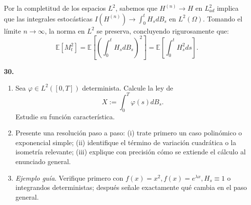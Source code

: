 \documentclass[11pt, letterpaper]{article}
\begin{document}
\begin{solucion}
    Por la completitud de los espacios $L^2$, sabemos que $H^{(n)} \to H$ en $L^2_{ad}$ implica que las integrales estocásticas $I(H^{(n)}) \to \int_0^t H_s dB_s$ en $L^2(\Omega)$. 
    Tomando el límite $n \to \infty$, la norma en $L^2$ se preserva, concluyendo rigurosamente que:
    \[ \mathbb{E}[M_t^2] = \mathbb{E}\left[ \left( \int_0^t H_s dB_s \right)^2 \right] = \mathbb{E}\left[ \int_0^t H_s^2 ds \right]. \]
\end{solucion}

\newpage

\begin{ejercicio}
    \textbf{30.} 
    \begin{enumerate}
        \item Sea $\varphi \in L^2([0,T])$ determinista. Calcule la ley de
        \[ X := \int_0^T \varphi(s) dB_s. \]
        Estudie su función característica.
        \item Presente una resolución paso a paso: (i) trate primero un caso polinómico o exponencial simple; (ii) identifique el término de variación cuadrática o la isometría relevante; (iii) explique con precisión cómo se extiende el cálculo al enunciado general.
        \item \textit{Ejemplo guía}. Verifique primero con $f(x) = x^2, f(x) = e^{\lambda x}, H_s \equiv 1$ o integrandos deterministas; después señale exactamente qué cambia en el paso general.
    \end{enumerate}
\end{ejercicio}

\vspace{5mm}
\end{document}
